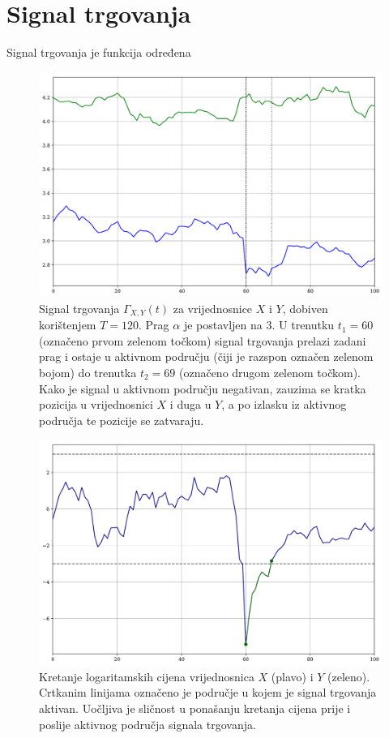 \documentclass[lmodern, utf8, diplomski, numeric]{fer}
\newcommand{\q}{\left}
\newcommand{\w}{\right}
\begin{document}
  \section{Signal trgovanja}
  Signal trgovanja je funkcija određena 
  
  \begin{figure}[p]
    \centering
    \includegraphics[width=\linewidth]{graphics/trading-signal.pdf}
    \caption{Signal trgovanja $\Gamma_{X, Y}\q(t \w)$ za vrijednosnice $X$ i $Y$, dobiven korištenjem $T = 120$. Prag $\alpha$ je postavljen na 3. U trenutku $t_1 = 60$ (označeno prvom zelenom točkom) signal trgovanja prelazi zadani prag i ostaje u aktivnom području (čiji je razspon označen zelenom bojom) do trenutka $t_2 = 69$ (označeno drugom zelenom točkom). Kako je signal u aktivnom području negativan, zauzima se kratka pozicija u vrijednosnici $X$ i duga u $Y$, a po izlasku iz aktivnog područja te pozicije se zatvaraju.}
    \label{fig:trading-signal}
  \end{figure}
  
  \begin{figure}[p]
    \centering
    \includegraphics[width=\linewidth]{graphics/trading-prices.pdf}
    \caption{Kretanje logaritamskih cijena vrijednosnica $X$ (plavo) i $Y$ (zeleno). Crtkanim linijama označeno je područje u kojem je signal trgovanja aktivan. Uočljiva je sličnost u ponašanju kretanja cijena prije i poslije aktivnog područja signala trgovanja.}
    \label{fig:trading-prices}
  \end{figure}
\end{document}
